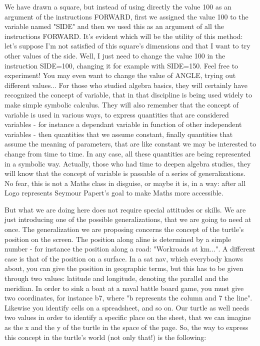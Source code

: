 \vskip 1cm

We have drawn a square, but instead of using directly the value 100 as an argument of the instructions FORWARD, first we assigned the value 100 to the variable named "SIDE" and then we used this as an argument of all the instructions FORWARD. It's evident which will be the utility of this method: let's suppose I'm not satisfied of this square's dimensions and that I want to try other values of the side. Well, I just need to change the value 100 in the instruction SIDE=100, changing it for example with SIDE=150. Feel free to experiment! You may even want to change the value of ANGLE, trying out different values...
For those who studied algebra basics, they will certainly have recognized the concept of variable, that in that discipline is being used widely to make simple symbolic calculus. They will also remember that the concept of variable is used in various ways, to express quantities that are considered variables - for instance a dependant variable in function of other independent variables - then quantities that we assume constant, finally quantities that assume the meaning of parameters, that are like constant we may be interested to change from time to time.
In any case, all these quantities are being represented in a symbolic way. Actually, those who had time to deepen algebra studies, they will know that the concept of variable is passable of a series of generalizations. No fear, this is not a Maths class in disguise, or maybe it is, in a way: after all Logo represents Seymour Papert's goal to make Maths more accessible.
 
 But what we are doing here does not require special attitudes or skills. We are just introducing one of the possible generalizations, that we are going to need at once. The generalization we are proposing concerns the concept of the turtle's position on the screen.
  The position along aline is determined by a simple number - for instance the position along a road: "Workroads at km...". A different case is that of the position on a surface. In a sat nav, which everybody knows about, you can give the position in geographic terms, but this has to be given through two values: latitude and longitude, denoting the parallel and the meridian. In order to sink a boat at a naval battle board game, you must give two coordinates, for instance b7, where "b represents the column and 7 the line". Likewise you identify cells on a spreadsheet, and so on. Our turtle as well needs two values in order to identify a specific place on the sheet, that we can imagine as the x and the y of the turtle in the space of the page. So, the way to express this concept in the turtle's world (not only that!) is the following:
  

